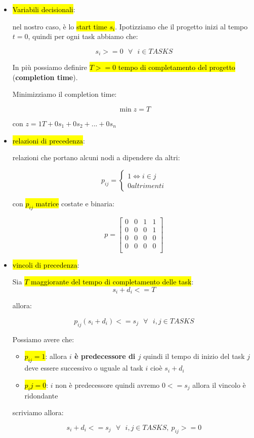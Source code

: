 \begin{itemize}
	\item \hl{Variabili decisionali}:
		
		nel nostro caso, è lo \hl{start time $s_i$}. Ipotizziamo che il progetto inizi al tempo $t = 0$, quindi per ogni task abbiamo che:

			$$s_i >= 0\ \ \ \forall\ \ \ i \in TASKS$$

		In più possiamo definire \hl{$T >= 0$ tempo di completamento del progetto} (\textbf{completion time}).

		Minimizziamo il completion time:

			$$\min z = T$$

		con $z = 1T + 0s_1 + 0s_2 + ... + 0s_n$
		
		
	\item \hl{relazioni di precedenza}:
	
		relazioni che portano alcuni nodi a dipendere da altri:
		
		$$
		p_{ij}=
		\begin{cases} 
		    1 \Leftrightarrow i \in j \\ 
		    0 altrimenti
		\end{cases}$$
		
		con \hl{$p_{ij}$ matrice} costate e binaria:
		
		$$p =
		\left[ {\begin{array}{cccc}
		    0 & 0 & 1 & 1 \\
			0 & 0 & 0 & 1 \\
		    0 & 0 & 0 & 0 \\
		    0 & 0 & 0 & 0 \\
		\end{array} } \right]$$
		
	
	\item \hl{vincoli di precedenza}:
	
		Sia \hl{$T$ maggiorante del tempo di completamento delle task}:
			$$s_i + d_i <= T$$

		allora:

			$$p_{ij} (s_i + d_i) <= s_j\ \ \ \forall\ \ \ i,j \in TASKS$$

		Possiamo avere che:

		\begin{itemize}
			\item \hl{$p_{ij} = 1$}: allora \textbf{$i$ è predecessore di $j$} quindi il tempo di inizio del task $j$ deve essere successivo o uguale al task $i$ cioè $s_i + d_i$
	
			\item \hl{$p_ij = 0$}: $i$ non è predecessore quindi avremo $0 <= s_j$ allora il vincolo è ridondante
		\end{itemize}
		
		scriviamo allora:
 
		$$s_i + d_i <= s_j\ \ \ \forall\ \ \ i,j \in TASKS,\ p_{ij} >= 0$$


\end{itemize}


